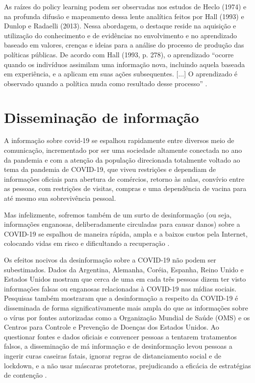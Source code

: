 As raízes do policy learning podem ser observadas nos estudos de Heclo (1974) e na profunda difusão e mapeamento dessa lente analítica feitos por Hall (1993) e Dunlop e Radaelli (2013). Nessa abordagem, o destaque reside na aquisição e utilização do conhecimento e de evidências no envolvimento e no aprendizado baseado em valores, crenças e ideias para a análise do processo de produção das políticas públicas. De acordo com Hall (1993, p. 278), o aprendizado “ocorre quando os indivíduos assimilam uma informação nova, incluindo aquela
baseada em experiência, e a aplicam em suas ações subsequentes. [...] O aprendizado é observado quando a política muda como resultado desse processo” \cite{brasil2020estudos}.

\section{Disseminação de informação}

A informação sobre covid-19 se espalhou rapidamente entre diversos meio de comunicação, incrementado por ser uma sociedade altamente conectada no ano da pandemia e com a atenção da população direcionada totalmente voltado ao tema da pandemia de COVID-19, que viveu restrições e dependiam de informações oficiais para abertura de comércios, retorno às aulas, convívio entre as pessoas, com restrições de visitas, compras e uma dependência de vacina para até mesmo sua sobrevivência pessoal.

Mas infelizmente, sofremos também de um surto de desinformação (ou seja, informações enganosas, deliberadamente circuladas para causar danos) sobre a COVID-19 se espalhou de maneira rápida, ampla e a baixos custos pela Internet, colocando vidas em risco e dificultando a recuperação \cite{Ocombate55:online}.

Os efeitos nocivos da desinformação sobre a COVID-19 não podem ser subestimados. Dados \cite{Navigati3:online} da Argentina, Alemanha, Coréia, Espanha, Reino Unido e Estados Unidos mostram que cerca de uma em cada três pessoas dizem ter visto informações falsas ou enganosas relacionadas à COVID-19 nas mídias sociais. Pesquisas também mostraram que a desinformação a respeito da COVID-19 é disseminada de forma significativamente mais ampla do que as informações sobre o vírus por fontes autorizadas como a Organização Mundial de Saúde (OMS) e os Centros para Controle e Prevenção de Doenças dos Estados Unidos. Ao questionar fontes e dados oficiais e convencer pessoas a tentarem tratamentos falsos, a disseminação de má informação e de desinformação levou pessoas a ingerir curas caseiras fatais, ignorar regras de distanciamento social e de lockdown, e a não usar máscaras protetoras, prejudicando a eficácia de estratégias de contenção \cite{Ocombate55:online}.

